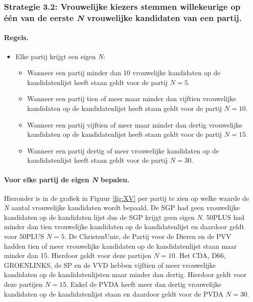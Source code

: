\subsubsection{Strategie 3.2: Vrouwelijke kiezers stemmen willekeurige op één van de eerste \textit{N} vrouwelijke kandidaten van een partij.}

\paragraph{Regels.}
\begin{itemize}
\item
Elke partij krijgt een eigen \textit{N}:

	\begin{itemize}
		\item
Wanneer een partij minder dan 10 vrouwelijke kandidaten op de kandidatenlijst heeft staan geldt voor de partij $N=5$.
		\item
Wanneer een partij tien of meer maar minder dan vijftien vrouwelijke kandidaten op de kandidatenlijst heeft staan geldt voor de partij $N=10$.
		\item
Wanneer een partij vijftien of meer maar minder dan dertig vrouwelijke kandidaten op de kandidatenlijst heeft staan geldt voor de partij $N=15$.
		\item
Wanneer een partij dertig of meer vrouwelijke kandidaten op de kandidatenlijst heeft staan geldt voor de partij $N=30$.
	\end{itemize}
\end{itemize}


\paragraph{Voor elke partij de eigen \textit{N} bepalen.}
Hieronder is in de grafiek in Figuur \ref{fig:XV} per partij te zien op welke waarde de \textit{N} aantal vrouwelijke kandidaten wordt bepaald. De SGP had geen vrouwelijke kandidaten op de kandidaten lijst dus de SGP krijgt geen eigen \textit{N}. 50PLUS had minder dan tien vrouwelijke kandidaten op de kandidatenlijst en daardoor geldt voor 50PLUS $N=5$. De ChristenUnie, de Partij voor de Dieren en de PVV hadden tien of meer vrouwelijke kandidaten op de kandidatenlijst staan maar minder dan 15. Hierdoor geldt voor deze partijen $N=10$. Het CDA, D66, GROENLINKS, de SP en de VVD hebben vijftien of meer vrouwelijke kandidaten op de kandidatenlijsten maar minder dan dertig. Hierdoor geldt voor deze partijen $N=15$. Enkel de PVDA heeft meer dan dertig vrouwelijke kandidaten op de kandidatenlijst staan en daardoor geldt voor de PVDA $N=30$.

